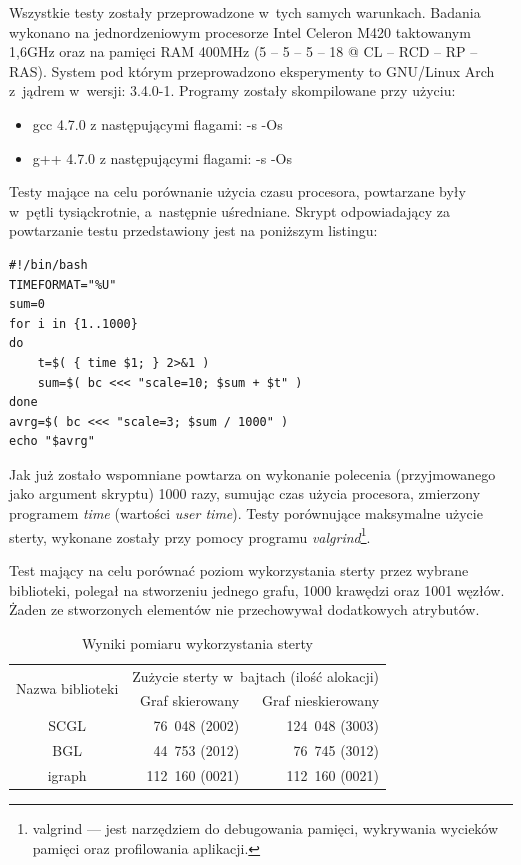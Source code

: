 \documentclass[a4paper,12pt,polish,twoside,openright]{thesis}
\begin{document}
Wszystkie testy zostały przeprowadzone w~tych samych warunkach.
Badania wykonano na jednordzeniowym procesorze Intel Celeron M420 taktowanym 1,6GHz oraz na pamięci RAM 400MHz (5 -- 5 -- 5 -- 18 @ CL -- RCD -- RP -- RAS).
System pod którym przeprowadzono eksperymenty to GNU/Linux Arch z~jądrem w~wersji: 3.4.0-1.
Programy zostały skompilowane przy użyciu:
\begin{itemize}
	\item gcc 4.7.0 z następującymi flagami: -s -Os
	\item g++ 4.7.0 z następującymi flagami: -s -Os
\end{itemize}

Testy mające na celu porównanie użycia czasu procesora, powtarzane były w~pętli tysiąckrotnie, a~następnie uśredniane.
Skrypt odpowiadający za powtarzanie testu przedstawiony jest na poniższym listingu:
\begin{lstlisting}[style=code,caption=Skrypt uśredniający czas wykonywania określonego określonego poleceniaa]
#!/bin/bash
TIMEFORMAT="%U"
sum=0
for i in {1..1000}
do
	t=$( { time $1; } 2>&1 )
	sum=$( bc <<< "scale=10; $sum + $t" )
done
avrg=$( bc <<< "scale=3; $sum / 1000" )
echo "$avrg"
\end{lstlisting}
Jak już zostało wspomniane powtarza on wykonanie polecenia (przyjmowanego jako argument skryptu) 1000 razy, sumując czas użycia procesora, zmierzony programem \emph{time} (wartości \emph{user time}).
Testy porównujące maksymalne użycie sterty, wykonane zostały przy pomocy programu \emph{valgrind}\footnote{valgrind --- jest narzędziem do debugowania pamięci, wykrywania wycieków pamięci oraz profilowania aplikacji.}.

Test mający na celu porównać poziom wykorzystania sterty przez wybrane biblioteki, polegał na stworzeniu jednego grafu, 1000 krawędzi oraz 1001 węzłów.
Żaden ze stworzonych elementów nie przechowywał dodatkowych atrybutów.
\begin{table}[htb]
\caption{Wyniki pomiaru wykorzystania sterty}
\label{tab:mem_size}
\centering
\begin{tabular}{ | c | r | r | }
	\hline
	\multirow{2}{*}{Nazwa biblioteki } & \multicolumn{2}{|c|}{Zużycie sterty w~bajtach (ilość alokacji)} \\
	\cline{2-3}
		& Graf skierowany & Graf nieskierowany \\
	\hline \hline
	SCGL    & 76~048  (2002) & 124~048 (3003) \\ \hline
	BGL     & 44~753  (2012) &  76~745 (3012) \\ \hline
	igraph  & 112~160 (0021) & 112~160 (0021) \\ \hline
\end{tabular}
\end{table}
\end{document}
